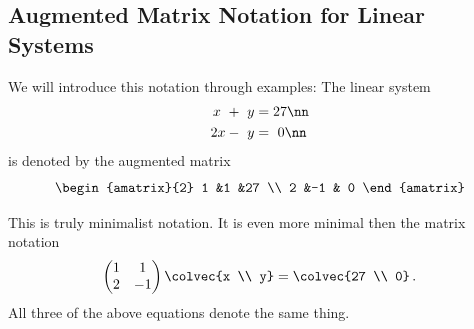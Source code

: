 \subsection{Augmented Matrix Notation for Linear Systems}

We will introduce this notation through examples: 
The linear system 
\begin{align}
	x\ +\ y & = 27\nn \\
	2x-\ y & =\  0\nn \,
\end{align}
is denoted by the augmented matrix
\[
\begin{amatrix}{2}
1 &1 &27 \\ 2 &-1 & 0
\end{amatrix}
\]

\noindent
This is truly minimalist notation. It is even more minimal then the matrix notation  
\begin{equation*}
    \begin{pmatrix}
      1             &1  \\
      2             &-1
    \end{pmatrix}
  \colvec{x \\ y}
  =
  \colvec{27 \\ 0}\, .
\end{equation*}
All three of the above equations denote the same thing. 



